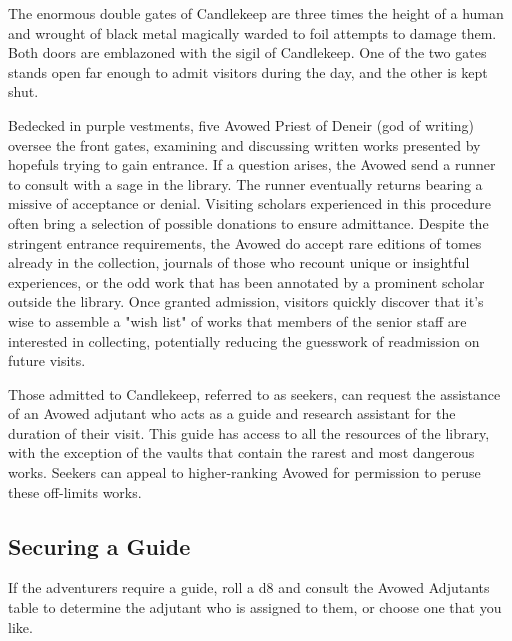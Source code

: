 \documentclass[10pt,a4paper,twoside,bg=print,twocolumn,openany,nodeprecatedcode]{dndbook}
\begin{document}
The enormous double gates of Candlekeep are three times the height of a human and wrought of black metal magically warded to foil attempts to damage them. Both doors are emblazoned with the sigil of Candlekeep. One of the two gates stands open far enough to admit visitors during the day, and the other is kept shut.

Bedecked in purple vestments, five Avowed Priest of Deneir (god of writing) oversee the front gates, examining and discussing written works presented by hopefuls trying to gain entrance. If a question arises, the Avowed send a runner to consult with a sage in the library. The runner eventually returns bearing a missive of acceptance or denial. Visiting scholars experienced in this procedure often bring a selection of possible donations to ensure admittance. Despite the stringent entrance requirements, the Avowed do accept rare editions of tomes already in the collection, journals of those who recount unique or insightful experiences, or the odd work that has been annotated by a prominent scholar outside the library. Once granted admission, visitors quickly discover that it's wise to assemble a "wish list" of works that members of the senior staff are interested in collecting, potentially reducing the guesswork of readmission on future visits.

Those admitted to Candlekeep, referred to as seekers, can request the assistance of an Avowed adjutant who acts as a guide and research assistant for the duration of their visit. This guide has access to all the resources of the library, with the exception of the vaults that contain the rarest and most dangerous works. Seekers can appeal to higher-ranking Avowed for permission to peruse these off-limits works.

\subsection{Securing a Guide}
If the adventurers require a guide, roll a d8 and consult the Avowed Adjutants table to determine the adjutant who is assigned to them, or choose one that you like.
\end{document}
